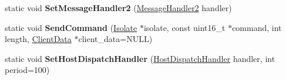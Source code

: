 \begin{DoxyCompactItemize}
\item 
\hypertarget{classv8_1_1Debug_a0375563b2a1e0b4ea5f70a742209bb3f}{static void {\bfseries Set\-Message\-Handler2} (\hyperlink{classv8_1_1Debug_a76bad493edc528bbe9f0924dd54114ca}{Message\-Handler2} handler)}\label{classv8_1_1Debug_a0375563b2a1e0b4ea5f70a742209bb3f}

\item 
\hypertarget{classv8_1_1Debug_aba2426f25ee7cd31659426287777bb00}{static void {\bfseries Send\-Command} (\hyperlink{classv8_1_1Isolate}{Isolate} $\ast$isolate, const uint16\-\_\-t $\ast$command, int length, \hyperlink{classv8_1_1Debug_1_1ClientData}{Client\-Data} $\ast$client\-\_\-data=N\-U\-L\-L)}\label{classv8_1_1Debug_aba2426f25ee7cd31659426287777bb00}

\item 
\hypertarget{classv8_1_1Debug_aa55c29d5cc7b04c4fc24cd89c77f3f54}{static void {\bfseries Set\-Host\-Dispatch\-Handler} (\hyperlink{classv8_1_1Debug_a93a06401b4d8bbdd09f00ff9125578c3}{Host\-Dispatch\-Handler} handler, int period=100)}\label{classv8_1_1Debug_aa55c29d5cc7b04c4fc24cd89c77f3f54}


\end{DoxyCompactItemize}
